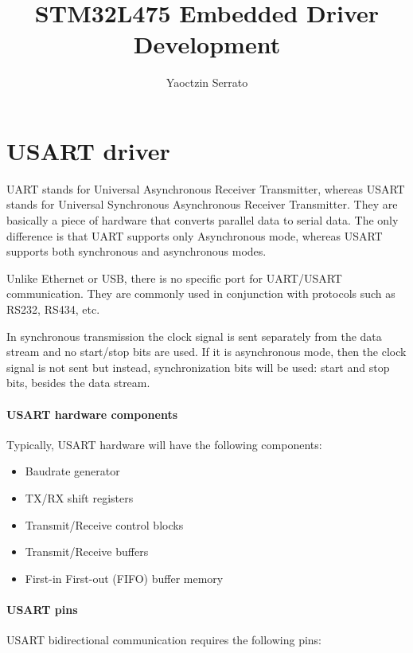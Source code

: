 \documentclass[
a4paper, %
11pt, %
onecolumn, %
openany, %
]{memoir}
\author{Yaoctzin Serrato}
\title{STM32L475 Embedded Driver Development}
\begin{document}
\frontmatter

\maketitle

\begin{abstract}
\lipsum[1-2]
\end{abstract}
\clearpage

\tableofcontents*
\clearpage

\chapter{USART driver}

UART stands for Universal Asynchronous Receiver Transmitter, whereas USART stands for Universal Synchronous Asynchronous Receiver Transmitter. They are basically a piece of hardware that converts parallel data to serial data. The only difference is that UART supports only Asynchronous mode, whereas USART supports both synchronous and asynchronous modes.

\noindent Unlike Ethernet or USB, there is no specific port for UART/USART communication. They are commonly used in conjunction with protocols such as RS232, RS434, etc.

\noindent In synchronous transmission the clock signal is sent separately from the data stream and no start/stop bits are used. If it is asynchronous mode, then the clock signal is not sent but instead, synchronization bits will be used: start and stop bits, besides the data stream.

\subsubsection{USART hardware components}
Typically, USART hardware will have the following components:

\begin{itemize}
	\item	Baudrate generator
	\item	TX/RX shift registers
	\item	Transmit/Receive control blocks
	\item	Transmit/Receive buffers
	\item	First-in First-out (FIFO) buffer memory
\end{itemize}

\subsubsection{USART pins}
USART bidirectional communication requires the following pins:
\end{document}
